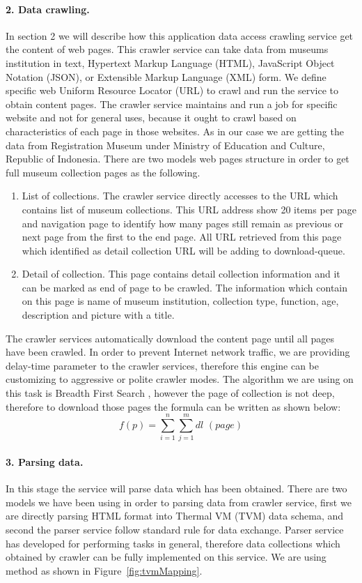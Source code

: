 \paragraph{2. Data crawling.}  In section 2 we will describe how this application data access crawling service get the content of web pages. This crawler service can take data from museums institution in text, Hypertext Markup Language (HTML), JavaScript Object Notation (JSON), or Extensible Markup Language (XML) form. We define specific web Uniform Resource Locator (URL) to crawl and run the service to obtain content pages. The crawler service maintains and run a job for specific website and not for general uses, because it ought to crawl based on characteristics of each page in those websites. As in our case we are getting the data from Registration Museum under Ministry of Education and Culture, Republic of Indonesia. There are two models web pages structure in order to get full museum collection pages as the following.

\begin{enumerate}
	\item List of collections. The crawler service directly accesses to the URL which contains list of museum collections. This URL address show 20 items per page and navigation page to identify how many pages still remain as previous or next page from the first to the end page. All URL retrieved from this page which identified as detail collection URL will be adding to download-queue.
	\item Detail of collection. This page contains detail collection information and it can be marked as end of page to be crawled. The information which contain on this page is name of museum institution, collection type, function, age, description and picture with a title.
\end{enumerate}

The crawler services automatically download the content page until all pages have been crawled. In order to prevent Internet network traffic, we are providing delay-time parameter to the crawler services, therefore this engine can be customizing to aggressive or polite crawler modes. The algorithm we are using on this task is Breadth First Search \cite{HassaanBurtscherPingali}, however the page of collection is not deep, therefore to download those pages the formula can be written as shown below:
\[
f(p) = \sum_{i = 1}^{n} \sum_{j = 1}^{m} \textit{dl }(\textit{page})
\]

\paragraph{3. Parsing data.} In this stage the service will parse data which has been obtained. There are two models we have been using in order to parsing data from crawler service, first we are directly parsing HTML format into Thermal VM (TVM) data schema, and second the parser service follow standard rule for data exchange. Parser service has developed for performing tasks in general, therefore data collections which obtained by crawler can be fully implemented on this service. We are using method as shown in Figure~\cref{fig:tvmMapping}.

